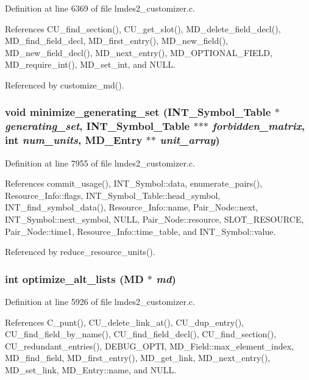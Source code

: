 Definition at line 6369 of file lmdes2\_\-customizer.c.

References CU\_\-find\_\-section(), CU\_\-get\_\-slot(), MD\_\-delete\_\-field\_\-decl(), MD\_\-find\_\-field\_\-decl, MD\_\-first\_\-entry(), MD\_\-new\_\-field(), MD\_\-new\_\-field\_\-decl(), MD\_\-next\_\-entry(), MD\_\-OPTIONAL\_\-FIELD, MD\_\-require\_\-int(), MD\_\-set\_\-int, and NULL.

Referenced by customize\_\-md().
\subsubsection{\setlength{\rightskip}{0pt plus 5cm}void minimize\_\-generating\_\-set (\bf{INT\_\-Symbol\_\-Table} $\ast$ {\em generating\_\-set}, \bf{INT\_\-Symbol\_\-Table} $\ast$$\ast$$\ast$ {\em forbidden\_\-matrix}, int {\em num\_\-units}, \bf{MD\_\-Entry} $\ast$$\ast$ {\em unit\_\-array})}\label{lmdes2__customizer_8c_4a7cfc80caf1cc2ac73c2347fa710f63}




Definition at line 7955 of file lmdes2\_\-customizer.c.

References commit\_\-usage(), INT\_\-Symbol::data, enumerate\_\-pairs(), Resource\_\-Info::flags, INT\_\-Symbol\_\-Table::head\_\-symbol, INT\_\-find\_\-symbol\_\-data(), Resource\_\-Info::name, Pair\_\-Node::next, INT\_\-Symbol::next\_\-symbol, NULL, Pair\_\-Node::resource, SLOT\_\-RESOURCE, Pair\_\-Node::time1, Resource\_\-Info::time\_\-table, and INT\_\-Symbol::value.

Referenced by reduce\_\-resource\_\-units().
\subsubsection{\setlength{\rightskip}{0pt plus 5cm}int optimize\_\-alt\_\-lists (\bf{MD} $\ast$ {\em md})}\label{lmdes2__customizer_8c_68281f2aaba233f2380c5774122253be}




Definition at line 5926 of file lmdes2\_\-customizer.c.

References C\_\-punt(), CU\_\-delete\_\-link\_\-at(), CU\_\-dup\_\-entry(), CU\_\-find\_\-field\_\-by\_\-name(), CU\_\-find\_\-field\_\-decl(), CU\_\-find\_\-section(), CU\_\-redundant\_\-entries(), DEBUG\_\-OPTI, MD\_\-Field::max\_\-element\_\-index, MD\_\-find\_\-field, MD\_\-first\_\-entry(), MD\_\-get\_\-link, MD\_\-next\_\-entry(), MD\_\-set\_\-link, MD\_\-Entry::name, and NULL.

